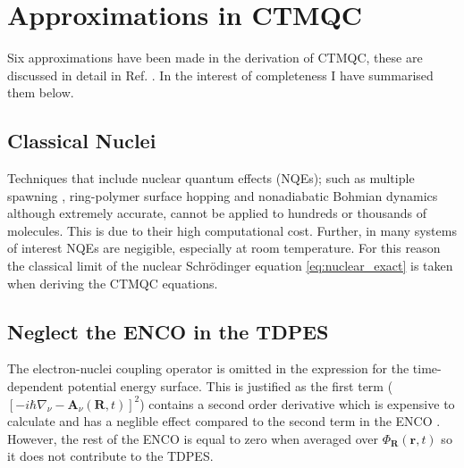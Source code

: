 \section{Approximations in CTMQC}
Six approximations have been made in the derivation of CTMQC, these are discussed in detail in Ref. \cite{agostini_quantum-classical_2016}. In the interest of completeness I have summarised them below.
\subsection{Classical Nuclei}
Techniques that include nuclear quantum effects (NQEs); such as multiple spawning \cite{Martnnez*2005Oct}, ring-polymer surface hopping \cite{Shakib2017Jul} and nonadiabatic Bohmian dynamics \cite{Curchod2011Feb, Tavernelli2013Apr} although extremely accurate, cannot be applied to hundreds or thousands of molecules. This is due to their high computational cost. Further, in many systems of interest NQEs are negigible, especially at room temperature. For this reason the classical limit of the nuclear Schr\"odinger equation \eqref{eq:nuclear_exact} is taken when deriving the CTMQC equations.
\subsection{Neglect the ENCO in the TDPES}
The electron-nuclei coupling operator is omitted in the expression for the time-dependent potential energy surface. This is justified as the first term ($\left[-i \hbar \nabla_{\nu} - \textbf{A}_{\nu}(\textbf{R}, t) \right]^2$) contains a second order derivative which is expensive to calculate and has a neglible effect compared to the second term in the ENCO \cite{Scherrer2015Aug}. However, the rest of the ENCO is equal to zero when averaged over $\Phi_{\textbf{R}}(\textbf{r},t)$ so it does not contribute to the TDPES.
